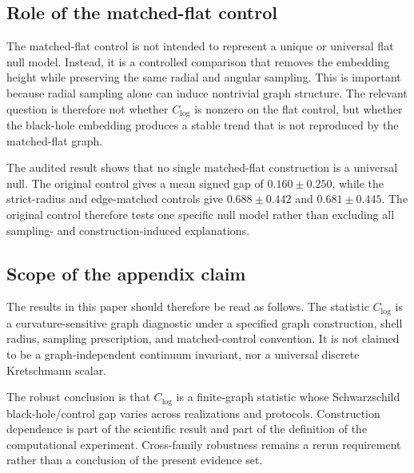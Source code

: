 \documentclass[11pt,a4paper]{article}
\begin{document}
\subsection{Role of the matched-flat control}

The matched-flat control is not intended to represent a unique or universal flat null model. Instead, it is a controlled comparison that removes the embedding height while preserving the same radial and angular sampling. This is important because radial sampling alone can induce nontrivial graph structure. The relevant question is therefore not whether $C_{\log}$ is nonzero on the flat control, but whether the black-hole embedding produces a stable trend that is not reproduced by the matched-flat graph.

The audited result shows that no single matched-flat construction is a universal null. The original control gives a mean signed gap of $0.160\pm0.250$, while the strict-radius and edge-matched controls give $0.688\pm0.442$ and $0.681\pm0.445$. The original control therefore tests one specific null model rather than excluding all sampling- and construction-induced explanations.

\subsection{Scope of the appendix claim}

The results in this paper should therefore be read as follows. The statistic $C_{\log}$ is a curvature-sensitive graph diagnostic under a specified graph construction, shell radius, sampling prescription, and matched-control convention. It is not claimed to be a graph-independent continuum invariant, nor a universal discrete Kretschmann scalar.

The robust conclusion is that $C_{\log}$ is a finite-graph statistic whose Schwarzschild black-hole/control gap varies across realizations and protocols. Construction dependence is part of the scientific result and part of the definition of the computational experiment. Cross-family robustness remains a rerun requirement rather than a conclusion of the present evidence set.
\end{document}
